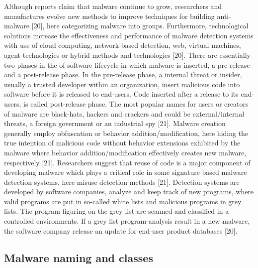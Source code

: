 \documentclass[12pt]{article} %
\begin{document}
Although reports claim that malware continue to grow, researchers and manufactures evolve new methods to improve techniques for building anti-malware [20], here categorizing malware into groups. Furthermore, technological solutions increase the effectiveness and performance of malware detection systems with use of cloud computing, network-based detection, web, virtual machines, agent technologies or hybrid methods and technologies [20]. There are essentially two phases in the of software lifecycle in which malware is inserted, a pre-release and a post-release phase. In the pre-release phase, a internal threat or insider, usually a trusted developer within an organization, insert malicious code into software before it is released to end-users. Code inserted  after a release to its end-users, is called post-release phase. The most popular names for users or creators of malware are black-hats, hackers and crackers and could be external/internal threats, a foreign government or an industrial spy [21]. Malware creation generally employ obfuscation or behavior addition/modification, here hiding the true intention of malicious code without behavior extensions exhibited by the malware where behavior addition/modification effectively creates new malware, respectively [21]. 
Researchers suggest that reuse of code is a major component of developing malware which plays a critical role in some signature based malware detection systems, here misuse detection methods [21]. Detection systems are developed by software companies, analyze and keep track of new programs, where valid programs are put in so-called white lists and malicious programs in grey lists. The program figuring on the grey list are scanned and classified in a controlled environments. If a grey list program-analysis result in a new malware, the software company release an update for end-user product databases [20]. 

\subsection{Malware naming and classes}
\end{document}
